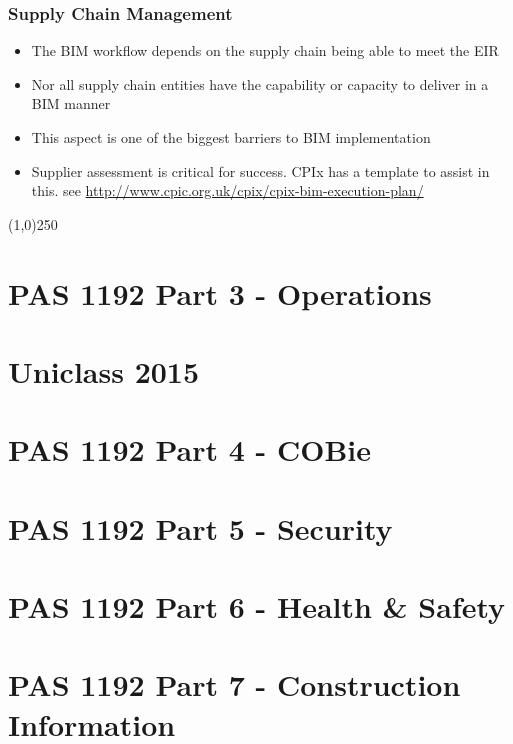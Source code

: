 \begin{frame}
\frametitle{Supply Chain Management}
\begin{itemize}
	\item The BIM workflow depends on the supply chain being able to meet the EIR
	\item Nor all supply chain entities have the capability or capacity to deliver in a BIM manner
	\item This aspect is one of the biggest barriers to BIM implementation
	\item Supplier assessment is critical for success.  CPIx has a template to assist in this.  see \href{http://www.cpic.org.uk/cpix/cpix-bim-execution-plan/}{http://www.cpic.org.uk/cpix/cpix-bim-execution-plan/}
\end{itemize}
\end{frame}
\begin{center}\line(1,0){250}\end{center}


\section{PAS 1192 Part 3 - Operations}







\section{Uniclass 2015}


\section{PAS 1192 Part 4 - COBie}



\section{PAS 1192 Part 5 - Security}




\section{PAS 1192 Part 6 - Health & Safety}




\section{PAS 1192 Part 7 - Construction Information}





